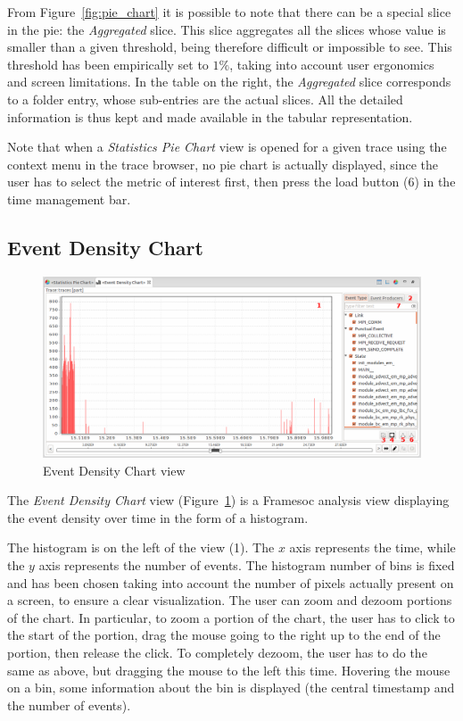 \documentclass[twoside]{article}
\begin{document}
\begin{sloppypar}
From Figure~\ref{fig:pie_chart} it is possible to note that there can be a special slice in the pie: the \emph{Aggregated} slice.
This slice aggregates all the slices whose value is smaller than a given threshold, being therefore difficult or impossible to see.
This threshold has been empirically set to $1\%$, taking into account user ergonomics and screen limitations.
In the table on the right, the \emph{Aggregated} slice corresponds to a folder entry, whose sub-entries are the actual slices.
All the detailed information is thus kept and made available in the tabular representation.

Note that when a \emph{Statistics Pie Chart} view is opened for a given trace using the context menu in the trace browser, no pie chart is actually displayed, since the user has to select the metric of interest first, then press the load button (\num{6}) in the time management bar.

\subsection{Event Density Chart}
\label{subsec:histogram}

\begin{figure}[h!]
  \centering
    \includegraphics[width=1.0\textwidth]{images/histogram.png}
  \caption{Event Density Chart view}
  \label{fig:histogram}
\end{figure}

The \emph{Event Density Chart} view (Figure~\ref{fig:histogram}) is a Framesoc analysis view displaying the event density over time in the form of a histogram.

The histogram is on the left of the view (\num{1}).
The $x$ axis represents the time, while the $y$ axis represents the number of events.
The histogram number of bins is fixed and has been chosen taking into account the number of pixels actually present on a screen, to ensure a clear visualization. 
The user can zoom and dezoom portions of the chart. 
In particular, to zoom a portion of the chart, the user has to click to the start of the portion, drag the mouse going to the right up to the end of the portion, then release the click.
To completely dezoom, the user has to do the same as above, but dragging the mouse to the left this time.
Hovering the mouse on a bin, some information about the bin is displayed (the central timestamp and the number of events).


\end{sloppypar}
\end{document}
